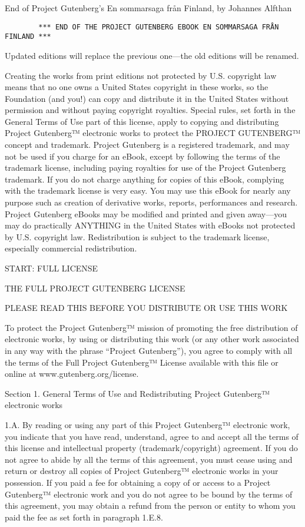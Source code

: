 End of Project Gutenberg's En sommarsaga från Finland, by Johannes
Alfthan

\begin{verbatim}
        *** END OF THE PROJECT GUTENBERG EBOOK EN SOMMARSAGA FRÅN FINLAND ***
\end{verbatim}

Updated editions will replace the previous one---the old editions will
be renamed.

Creating the works from print editions not protected by U.S. copyright
law means that no one owns a United States copyright in these works, so
the Foundation (and you!) can copy and distribute it in the United
States without permission and without paying copyright royalties.
Special rules, set forth in the General Terms of Use part of this
license, apply to copying and distributing Project Gutenberg™ electronic
works to protect the PROJECT GUTENBERG™ concept and trademark. Project
Gutenberg is a registered trademark, and may not be used if you charge
for an eBook, except by following the terms of the trademark license,
including paying royalties for use of the Project Gutenberg trademark.
If you do not charge anything for copies of this eBook, complying with
the trademark license is very easy. You may use this eBook for nearly
any purpose such as creation of derivative works, reports, performances
and research. Project Gutenberg eBooks may be modified and printed and
given away---you may do practically ANYTHING in the United States with
eBooks not protected by U.S. copyright law. Redistribution is subject to
the trademark license, especially commercial redistribution.

START: FULL LICENSE

THE FULL PROJECT GUTENBERG LICENSE

PLEASE READ THIS BEFORE YOU DISTRIBUTE OR USE THIS WORK

To protect the Project Gutenberg™ mission of promoting the free
distribution of electronic works, by using or distributing this work (or
any other work associated in any way with the phrase ``Project
Gutenberg''), you agree to comply with all the terms of the Full Project
Gutenberg™ License available with this file or online at
www.gutenberg.org/license.

Section 1. General Terms of Use and Redistributing Project Gutenberg™
electronic works

1.A. By reading or using any part of this Project Gutenberg™ electronic
work, you indicate that you have read, understand, agree to and accept
all the terms of this license and intellectual property
(trademark/copyright) agreement. If you do not agree to abide by all the
terms of this agreement, you must cease using and return or destroy all
copies of Project Gutenberg™ electronic works in your possession. If you
paid a fee for obtaining a copy of or access to a Project Gutenberg™
electronic work and you do not agree to be bound by the terms of this
agreement, you may obtain a refund from the person or entity to whom you
paid the fee as set forth in paragraph 1.E.8.

